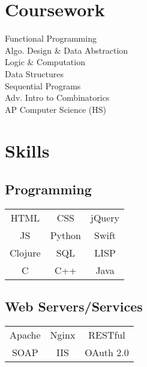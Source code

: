 \documentclass[letterpaper]{deedy-resume} %
\begin{document}
\begin{minipage}[t]{0.33\textwidth}

  \section{Coursework}

  Functional Programming \\
  Algo. Design \& Data Abstraction \\
  Logic \& Computation \\
  Data Structures \\
  Sequential Programs \\
  Adv. Intro to Combinatorics \\
  AP Computer Science (HS)

  \sectionspace %


  \section{Skills}

  \vspace{2mm}

  \subsection{Programming}

  \begin{tabular}{ c c c }
    HTML    & CSS    & jQuery \\
    JS      & Python & Swift    \\
    Clojure & SQL    & LISP   \\
    C       & C++    & Java \\
  \end{tabular}

  \vspace{4mm}

  \subsection{Web Servers/Services}

  \begin{tabular}{ c c c }
    Apache & Nginx & RESTful \\
    SOAP & IIS & OAuth 2.0
  \end{tabular}


\end{minipage}
\end{document}

